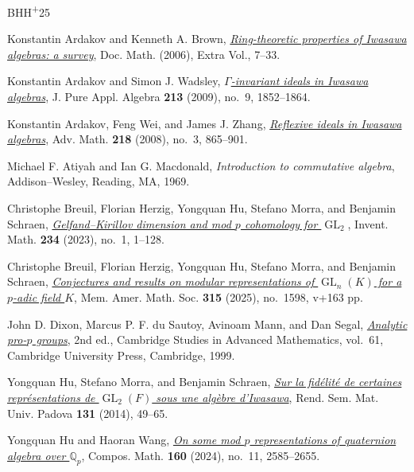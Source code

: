 \documentclass[11pt]{article}
\numberwithin{equation}{section}
\theoremstyle{definition}
\theoremstyle{remark}
\newcommand{\Q}{\mathbb Q}
\DeclareMathOperator{\GL}{GL}
\begin{document}
\begin{thebibliography}{BHH\textsuperscript{+}25}
\small

Konstantin Ardakov and Kenneth A. Brown,
\href{https://arxiv.org/abs/math/0511345}{\emph{Ring-theoretic properties
of Iwasawa algebras: a survey}},
Doc. Math. (2006), Extra Vol., 7--33.

Konstantin Ardakov and Simon J. Wadsley,
\href{https://doi.org/10.1016/j.jpaa.2009.02.001}{\emph{$\Gamma$-invariant
ideals in Iwasawa algebras}},
J. Pure Appl. Algebra \textbf{213} (2009), no.~9, 1852--1864.

Konstantin Ardakov, Feng Wei, and James J. Zhang,
\href{https://doi.org/10.1016/j.aim.2008.02.004}{\emph{Reflexive ideals
in Iwasawa algebras}},
Adv. Math. \textbf{218} (2008), no.~3, 865--901.

Michael F. Atiyah and Ian G. Macdonald,
\emph{Introduction to commutative algebra},
Addison--Wesley, Reading, MA, 1969.

Christophe Breuil, Florian Herzig, Yongquan Hu, Stefano Morra,
and Benjamin Schraen,
\href{https://doi.org/10.1007/s00222-023-01202-8}{\emph{Gelfand--Kirillov
dimension and mod $p$ cohomology for $\GL_2$}},
Invent. Math. \textbf{234} (2023), no.~1, 1--128.

Christophe Breuil, Florian Herzig, Yongquan Hu, Stefano Morra,
and Benjamin Schraen,
\href{https://doi.org/10.1090/memo/1598}{\emph{Conjectures and results
on modular representations of $\GL_n(K)$ for a $p$-adic field $K$}},
Mem. Amer. Math. Soc. \textbf{315} (2025), no.~1598, v+163 pp.

John D. Dixon, Marcus P. F. du Sautoy, Avinoam Mann, and Dan Segal,
\href{https://doi.org/10.1017/CBO9780511470882}{\emph{Analytic pro-$p$
groups}}, 2nd ed., Cambridge Studies in Advanced Mathematics, vol.~61,
Cambridge University Press, Cambridge, 1999.

Yongquan Hu, Stefano Morra, and Benjamin Schraen,
\href{https://doi.org/10.4171/RSMUP/131-4}{\emph{Sur la fid\'elit\'e
de certaines repr\'esentations de $\GL_2(F)$ sous une alg\`ebre d'Iwasawa}},
Rend. Sem. Mat. Univ. Padova \textbf{131} (2014), 49--65.

Yongquan Hu and Haoran Wang,
\href{https://doi.org/10.1112/S0010437X24007449}{\emph{On some mod $p$
representations of quaternion algebra over $\Q_p$}},
Compos. Math. \textbf{160} (2024), no.~11, 2585--2655.


\end{thebibliography}
\end{document}
